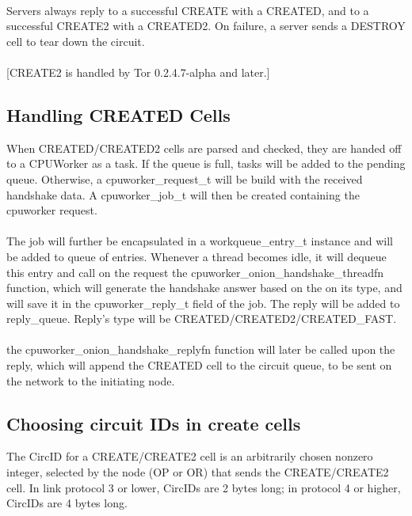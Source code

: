 \paragraph{}
Servers always reply to a successful CREATE with a CREATED, and to a
successful CREATE2 with a CREATED2. On failure, a server sends a
DESTROY cell to tear down the circuit.

\paragraph{}
[CREATE2 is handled by Tor 0.2.4.7-alpha and later.]

\subsection{Handling CREATED Cells}

When CREATED/CREATED2 cells are parsed and checked, they are handed off to a
CPUWorker as a task. If the queue is full, tasks will be added to the pending
queue. Otherwise, a cpuworker\_request\_t will be build with the received handshake
data. A cpuworker\_job\_t will then be created containing the cpuworker request.

\paragraph{}
The job will further be encapsulated in a workqueue\_entry\_t instance and will be
added to queue of entries. Whenever a thread becomes idle, it will dequeue this entry
and call on the request the cpuworker\_onion\_handshake\_threadfn function, which will
generate the handshake answer based on the on its type, and will save it in the
cpuworker\_reply\_t field of the job. The reply will be added to reply\_queue.
Reply's type will be CREATED/CREATED2/CREATED\_FAST.

\paragraph{}
the cpuworker\_onion\_handshake\_replyfn function will later be called upon the reply, which
will append the CREATED cell to the circuit queue, to be sent on the network to the
initiating node.


\subsection{Choosing circuit IDs in create cells}
The CircID for a CREATE/CREATE2 cell is an arbitrarily chosen
nonzero integer, selected by the node (OP or OR) that sends the
CREATE/CREATE2 cell. In link protocol 3 or lower, CircIDs are 2
bytes long; in protocol 4 or higher, CircIDs are 4 bytes long.

